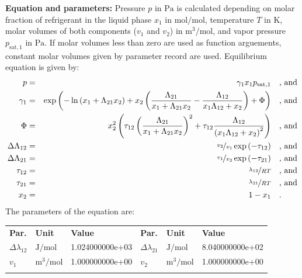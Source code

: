\textbf{Equation and parameters:}
\newline
%
Pressure $p$ in $\si{\pascal}$ is calculated depending on molar fraction of refrigerant in the liquid phase $x_1$ in $\si{\mole\per\mole}$, temperature $T$ in $\si{\kelvin}$, molar volumes of both components ($v_1$ and $v_2$) in $\si{\cubic\meter\per\mole}$, and vapor pressure $p_\mathrm{sat,1}$ in $\si{\pascal}$. If molar volumes less than zero are used as function arguements, constant molar volumes given by parameter record are used. Equilibrium equation is given by:
%
\begin{equation*}
\begin{split}
p &=& \gamma_1 x_1 p_\mathrm{sat,1} & \quad\text{, and} \\
\gamma_1 &=& \exp \left( - \ln \left( x_1 + \Lambda_{21} x_2 \right) + x_2 \left( \frac{\Lambda_{21}}{x_1 + \Lambda_{21} x_2} - \frac{\Lambda_{12}}{x_1 \Lambda_{12} + x_2} \right) + \Phi \right) & \quad\text{, and} \\
\Phi &=& x_2^2 \left( \tau_{12} \left( \frac{\Lambda_{21}}{x_1 + \Lambda_{21} x_2} \right) ^2 + \tau_{12} \frac{\Lambda_{12}}{\left( x_1 \Lambda_{12} + x_2 \right) ^2}  \right) & \quad\text{, and} \\
\Delta\Lambda_{12} &=& \nicefrac{v_2}{v_1} \exp \left( - \tau_{12} \right) & \quad\text{, and} \\
\Delta\Lambda_{21} &=& \nicefrac{v_1}{v_2} \exp \left( - \tau_{21} \right) & \quad\text{, and} \\
\tau_{12} &=& \nicefrac{\lambda_{12}}{R T} & \quad\text{, and} \\
\tau_{21} &=& \nicefrac{\lambda_{21}}{R T} & \quad\text{, and} \\
x_2 &=& 1 - x_1  & \quad\text{.} \\
\end{split}
\end{equation*}
%
The parameters of the equation are:
%
\begin{longtable}[l]{lll|lll}
\toprule
\addlinespace
\textbf{Par.} & \textbf{Unit} & \textbf{Value} &	\textbf{Par.} & \textbf{Unit} & \textbf{Value} \\
\addlinespace
\midrule
\endhead

\bottomrule
\endfoot
\bottomrule
\endlastfoot
\addlinespace

$\Delta\lambda_{12}$ & $\si{\joule\per\mole}$ & 1.024000000e+03 & $\Delta\lambda_{21}$ & $\si{\joule\per\mole}$ & 8.040000000e+02 \\
$v_1$ & $\si{\cubic\meter\per\mole}$ & 1.000000000e+00 & $v_2$ & $\si{\cubic\meter\per\mole}$ & 1.000000000e+00 \\

\addlinespace\end{longtable}

